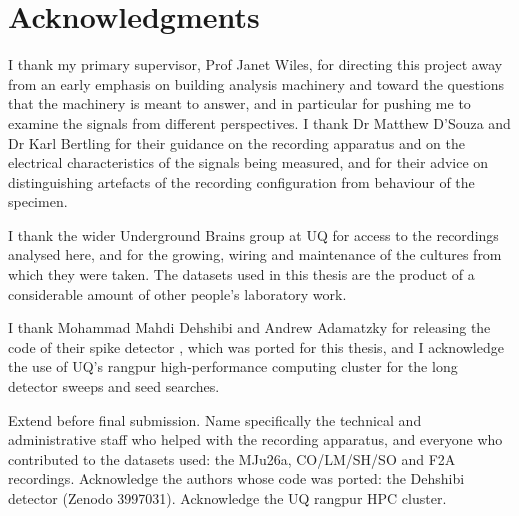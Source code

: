 \chapter{Acknowledgments}

I thank my primary supervisor, Prof Janet Wiles, for directing this project away from an early emphasis on building analysis machinery and toward the questions that the machinery is meant to answer, and in particular for pushing me to examine the signals from different perspectives. I thank Dr Matthew D'Souza and Dr Karl Bertling for their guidance on the recording apparatus and on the electrical characteristics of the signals being measured, and for their advice on distinguishing artefacts of the recording configuration from behaviour of the specimen.

I thank the wider Underground Brains group at UQ for access to the recordings analysed here, and for the growing, wiring and maintenance of the cultures from which they were taken. The datasets used in this thesis are the product of a considerable amount of other people's laboratory work.

I thank Mohammad Mahdi Dehshibi and Andrew Adamatzky for releasing the code of their spike detector \cite{dehshibi2020code}, which was ported for this thesis, and I acknowledge the use of UQ's rangpur high-performance computing cluster for the long detector sweeps and seed searches.

\begin{instructions}
Extend before final submission. Name specifically the technical and administrative staff who helped with the recording
apparatus, and everyone who contributed to the datasets used: the MJu26a, CO/LM/SH/SO and F2A recordings. Acknowledge
the authors whose code was ported: the Dehshibi detector (Zenodo 3997031). Acknowledge the UQ rangpur HPC cluster.
\end{instructions}
